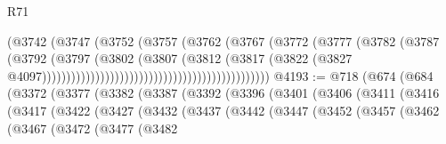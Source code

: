 \begin{lexlean}{R71}
\begin{coremodule}
                                                              (@3742
                                                                (@3747
                                                                  (@3752
                                                                    (@3757
                                                                      (@3762
                                                                        (@3767
                                                                          (@3772
                                                                            (@3777
                                                                              (@3782
                                                                                (@3787
                                                                                  (@3792
                                                                                    (@3797
                                                                                      (@3802
                                                                                        (@3807
                                                                                          (@3812
                                                                                            (@3817
                                                                                              (@3822
                                                                                                (@3827
                                                                                                  @4097)))))))))))))))))))))))))))))))))))))))))))))))
@4193 := @718
    (@674
      (@684
        (@3372
          (@3377
            (@3382
              (@3387
                (@3392
                  (@3396
                    (@3401
                      (@3406
                        (@3411
                          (@3416
                            (@3417
                              (@3422
                                (@3427
                                  (@3432
                                    (@3437
                                      (@3442
                                        (@3447
                                          (@3452
                                            (@3457
                                              (@3462
                                                (@3467
                                                  (@3472
                                                    (@3477
                                                      (@3482

\end{coremodule}
\end{lexlean}
